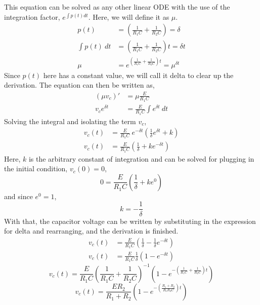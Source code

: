 \documentclass[12pt]{article}
\begin{document}
    This equation can be solved as any other linear ODE with the use of the
    integration factor, $e^{\int p(t) dt}$. Here, we will define it as $\mu$.
    \begin{align*}
        p(t) &= \left( \frac{1}{R_1C} + \frac{1}{R_2C} \right) = \delta \\
        \int p(t)\ dt &= \left( \frac{1}{R_1C} + \frac{1}{R_2C} \right)t = \delta t \\
        \mu &= e^{\left( \frac{1}{R_1C} + \frac{1}{R_2C} \right)t} = \mu^{\delta t}
    \end{align*}
    Since $p(t)$ here has a constant value, we will call it delta to clear up the
    derivation. The equation can then be written as,
    \begin{align*}
        \left( \mu v_{c} \right)' &= \mu \frac{E}{R_1C} \\
        v_{c}e^{\delta t} &= \frac{E}{R_1C} \int e^{\delta t}\ dt
    \end{align*}
    Solving the integral and isolating the term $v_{c}$,
    \begin{align*}
        v_{c}(t) &= \frac{E}{R_1C}\ e^{-\delta t} \left( \frac{1}{\delta} e^{\delta t} + k \right) \\
        v_{c}(t) &= \frac{E}{R_1C} \left( \frac{1}{\delta} + ke^{-\delta t} \right)
    \end{align*}
    Here, $k$ is the arbitrary constant of integration and can be solved for
    plugging in the initial condition, $v_{c}(0) = 0$,
    \[
        0 = \frac{E}{R_1C} \left( \frac{1}{\delta} + ke^{0} \right)
    \]
    and since $e^{0} = 1$,
    \[
        k = -\frac{1}{\delta}
    \]
    With that, the capacitor voltage can be written by substituting in the
    expression for delta and rearranging, and the derivation is finished.
    \begin{align*}
        v_{c}(t) &= \frac{E}{R_1C} \left( \frac{1}{\delta} - \frac{1}{\delta}e^{-\delta t} \right) \\
        v_{c}(t) &= \frac{E}{R_1C} \frac{1}{\delta} \left( 1 - e^{-\delta t} \right)
    \end{align*}
    \[
        v_{c}(t) = \frac{E}{R_1C} \left( \frac{1}{R_1C} + \frac{1}{R_2C}
        \right)^{-1} \left( 1 - e^{-\left( \frac{1}{R_1C} + \frac{1}{R_2C}
        \right)t} \right)
    \]
    \[
        \boxed{v_{c}(t) = \frac{ER_2}{R_1 + R_2} \left( 1 - e^{-\left( \frac{R_1 +
        R_2}{R_1R_2C} \right)t} \right)}
    \]
\end{document}
